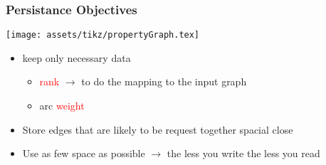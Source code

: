 \begin{frame}
    \frametitle{Persistance Objectives}
    \centering
    \texttt{[image: assets/tikz/propertyGraph.tex]}
    \begin{itemize}
        \item keep only necessary data
        \begin{itemize}
            \item \textcolor{red}{rank} $\rightarrow$ to do the mapping to the input graph
            \item arc \textcolor{red}{weight}
        \end{itemize}
        \item Store edges that are likely to be request together spacial close
        \item Use as few space as possible $\rightarrow$ the less you write the less you read
    \end{itemize}
\end{frame}